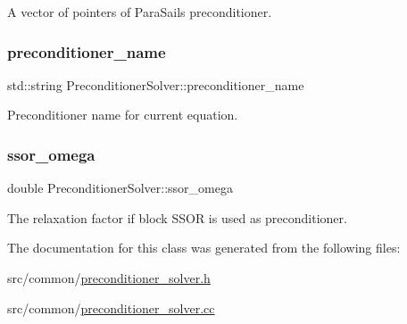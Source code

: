 A vector of pointers of Para\+Sails preconditioner. 

\mbox{\label{class_preconditioner_solver_a2d8afd11d073e87487da0442486c3e48}} 
\subsubsection{\texorpdfstring{preconditioner\+\_\+name}{preconditioner\_name}}
{\footnotesize\ttfamily std\+::string Preconditioner\+Solver\+::preconditioner\+\_\+name\hspace{0.3cm}{\ttfamily [private]}}



Preconditioner name for current equation. 

\mbox{\label{class_preconditioner_solver_ab9548e7699e82a2b006db283c59e4a80}} 
\subsubsection{\texorpdfstring{ssor\+\_\+omega}{ssor\_omega}}
{\footnotesize\ttfamily double Preconditioner\+Solver\+::ssor\+\_\+omega\hspace{0.3cm}{\ttfamily [private]}}



The relaxation factor if block S\+S\+OR is used as preconditioner. 



The documentation for this class was generated from the following files\+:\begin{DoxyCompactItemize}
\item 
src/common/\hyperlink{preconditioner__solver_8h}{preconditioner\+\_\+solver.\+h}\item 
src/common/\hyperlink{preconditioner__solver_8cc}{preconditioner\+\_\+solver.\+cc}\end{DoxyCompactItemize}
